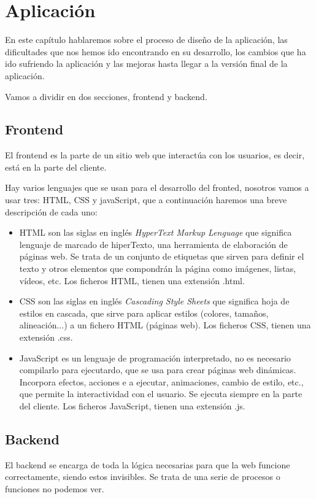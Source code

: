 \chapter{Aplicación}
\label{cap:aplicacion}

En este capítulo hablaremos sobre el proceso de diseño de la aplicación, las dificultades que nos hemos ido encontrando en su desarrollo, los cambios que ha ido sufriendo la aplicación y las mejoras hasta llegar a la versión final de la aplicación.

Vamos a dividir en dos secciones, frontend y backend.

\section{Frontend}

El frontend es la parte de un sitio web que interactúa con los usuarios, es decir, está en la parte del cliente. 

Hay varios lenguajes que se usan para el desarrollo del fronted, nosotros vamos a usar tres: HTML, CSS y javaScript, que a continuación haremos una breve descripción de cada uno:
 
\begin{itemize}
	\item HTML son las siglas en inglés \textit{HyperText Markup Lenguage} que significa lenguaje de marcado de hiperTexto, una herramienta de elaboración de páginas web. Se trata de un conjunto de etiquetas que sirven para definir el texto y otros elementos que compondrán la página como imágenes, listas, vídeos, etc. Los ficheros HTML, tienen una extensión .html.
	
	\item CSS son las siglas en inglés \textit{Cascading Style Sheets} que significa hoja de estilos en cascada, que sirve para aplicar estilos (colores, tamaños, alineación...) a un fichero HTML (páginas web). Los ficheros CSS, tienen una extensión .css.
	
		\item JavaScript es un lenguaje de programación interpretado, no es necesario compilarlo para ejecutardo, que se usa para crear páginas web dinámicas. Incorpora efectos, acciones e a ejecutar, animaciones, cambio de estilo, etc., que permite la interactividad con el usuario. Se ejecuta siempre en la parte del cliente. Los ficheros JavaScript, tienen una extensión .js.
	
\end{itemize}

\section{Backend}

El backend se encarga de toda la lógica necesarias para que la web funcione correctamente, siendo estos invisibles. Se trata de una serie de procesos o funciones no podemos ver.

